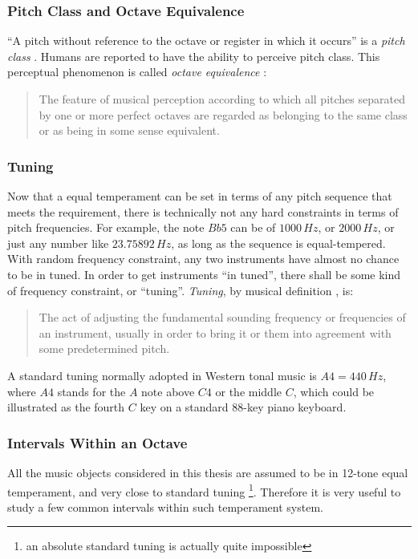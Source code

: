 \subsubsection{Pitch Class and Octave Equivalence}
``A pitch without reference to the octave or register in which it occurs'' is a {\it pitch class} \cite{randel1999harvard}. Humans are reported to have the ability to perceive pitch class. This perceptual phenomenon is called {\it octave equivalence} \cite{randel1999harvard,boring1942sensation}:

\begin{quote}
The feature of musical perception according to which all pitches separated by one or more perfect octaves are regarded as belonging to the same class or as being in some sense equivalent.
\end{quote}

\subsubsection{Tuning}
Now that a equal temperament can be set in terms of any pitch sequence that meets the requirement, there is technically not any hard constraints in terms of pitch frequencies. For example, the note $Bb5$ can be of $1000\,Hz$, or $2000\,Hz$, or just any number like $23.75892\,Hz$, as long as the sequence is equal-tempered. With random frequency constraint, any two instruments have almost no chance to be in tuned. In order to get instruments ``in tuned'', there shall be some kind of frequency constraint, or ``tuning''. {\it Tuning}, by musical definition \cite{randel1999harvard}, is:

\begin{quote}
The act of adjusting the fundamental sounding frequency or frequencies of an instrument, usually in order to bring it or them into agreement with some predetermined pitch.
\end{quote}

A standard tuning normally adopted in Western tonal music is $A4 = 440\,Hz$, where $A4$ stands for the $A$ note above $C4$ or the middle $C$, which could be illustrated as the fourth $C$ key on a standard 88-key piano keyboard.

\subsubsection{Intervals Within an Octave}
All the music objects considered in this thesis are assumed to be in 12-tone equal temperament, and very close to standard tuning \footnote{an absolute standard tuning is actually quite impossible}. Therefore it is very useful to study a few common intervals within such temperament system.

